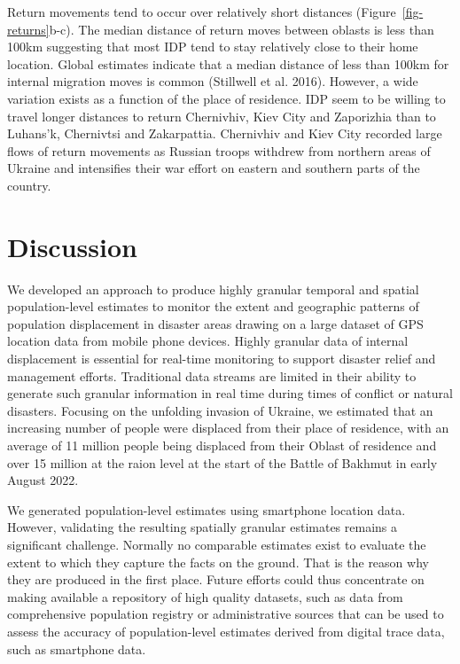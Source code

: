 \documentclass[
  sn-nature,
  11pt,
]{sn-jnl}
\begin{document}
Return movements tend to occur over relatively short distances
(Figure~\ref{fig-returns}b-c). The median distance of return moves
between oblasts is less than 100km suggesting that most IDP tend to stay
relatively close to their home location. Global estimates indicate that
a median distance of less than 100km for internal migration moves is
common (Stillwell et al. 2016). However, a wide variation exists as a
function of the place of residence. IDP seem to be willing to travel
longer distances to return Chernivhiv, Kiev City and Zaporizhia than to
Luhans'k, Chernivtsi and Zakarpattia. Chernivhiv and Kiev City recorded
large flows of return movements as Russian troops withdrew from northern
areas of Ukraine and intensifies their war effort on eastern and
southern parts of the country.

\section{Discussion}\label{discussion}

We developed an approach to produce highly granular temporal and spatial
population-level estimates to monitor the extent and geographic patterns
of population displacement in disaster areas drawing on a large dataset
of GPS location data from mobile phone devices. Highly granular data of
internal displacement is essential for real-time monitoring to support
disaster relief and management efforts. Traditional data streams are
limited in their ability to generate such granular information in real
time during times of conflict or natural disasters. Focusing on the
unfolding invasion of Ukraine, we estimated that an increasing number of
people were displaced from their place of residence, with an average of
11 million people being displaced from their Oblast of residence and
over 15 million at the raion level at the start of the Battle of Bakhmut
in early August 2022.

We generated population-level estimates using smartphone location data.
However, validating the resulting spatially granular estimates remains a
significant challenge. Normally no comparable estimates exist to
evaluate the extent to which they capture the facts on the ground. That
is the reason why they are produced in the first place. Future efforts
could thus concentrate on making available a repository of high quality
datasets, such as data from comprehensive population registry or
administrative sources that can be used to assess the accuracy of
population-level estimates derived from digital trace data, such as
smartphone data.
\end{document}
